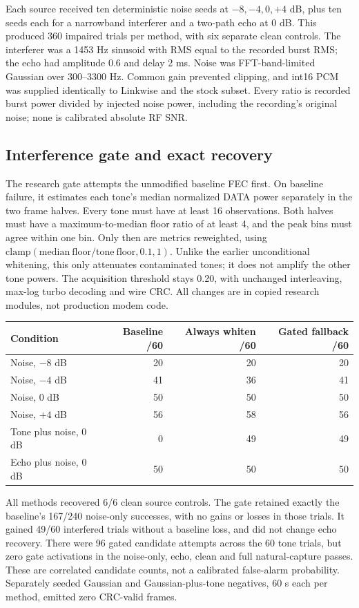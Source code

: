 \documentclass[11pt,a4paper]{article}
\begin{document}
Each source received ten deterministic noise seeds at $-8,-4,0,+4$ dB,
plus ten seeds each for a narrowband interferer and a two-path echo at
0 dB. This produced 360 impaired trials per method, with six separate clean
controls. The interferer was a 1453 Hz sinusoid with RMS equal to the
recorded burst RMS; the echo had amplitude 0.6 and delay 2 ms. Noise was
FFT-band-limited Gaussian over 300--3300 Hz. Common gain prevented clipping,
and int16 PCM was supplied identically to Linkwise and the stock subset.
Every ratio is recorded burst power divided by injected noise power,
including the recording's original noise; none is calibrated absolute RF SNR.

\subsection{Interference gate and exact recovery}
The research gate attempts the unmodified baseline FEC first. On baseline
failure, it estimates each tone's median normalized DATA power separately
in the two frame halves. Every tone must have at least 16 observations.
Both halves must have a maximum-to-median floor ratio of at least 4, and
the peak bins must agree within one bin. Only then are metrics reweighted,
using $\mathrm{clamp}(\mathrm{median\ floor}/\mathrm{tone\ floor},0.1,1)$.
Unlike the earlier unconditional whitening, this only attenuates contaminated
tones; it does not amplify the other tone powers. The acquisition threshold
stays 0.20, with unchanged interleaving, max-log turbo decoding and wire CRC.
All changes are in copied research modules, not production modem code.

\begin{center}
\begin{tabular}{lrrr}
\toprule
Condition & Baseline /60 & Always whiten /60 & Gated fallback /60 \\
\midrule
Noise, $-8$ dB & 20 & 20 & 20 \\
Noise, $-4$ dB & 41 & 36 & 41 \\
Noise, 0 dB & 50 & 50 & 50 \\
Noise, $+4$ dB & 56 & 58 & 56 \\
Tone plus noise, 0 dB & 0 & 49 & 49 \\
Echo plus noise, 0 dB & 50 & 50 & 50 \\
\bottomrule
\end{tabular}
\end{center}

All methods recovered 6/6 clean source controls. The gate retained exactly
the baseline's 167/240 noise-only successes, with no gains or losses in
those trials. It gained 49/60 interfered trials without a baseline loss,
and did not change echo recovery. There were 96 gated candidate attempts
across the 60 tone trials, but zero gate activations in the noise-only,
echo, clean and full natural-capture passes. These are correlated candidate
counts, not a calibrated false-alarm probability. Separately seeded
Gaussian and Gaussian-plus-tone negatives, 60 s each per method, emitted
zero CRC-valid frames.
\end{document}
